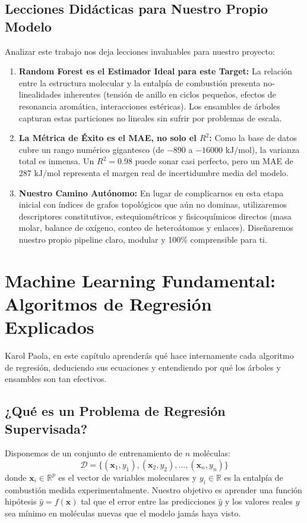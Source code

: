 \documentclass[11pt,letterpaper]{report}
\begin{document}
\section{Lecciones Didácticas para Nuestro Propio Modelo}
Analizar este trabajo nos deja lecciones invaluables para nuestro proyecto:
\begin{enumerate}[leftmargin=*]
    \item \textbf{Random Forest es el Estimador Ideal para este Target:} La relación entre la estructura molecular y la entalpía de combustión presenta no-linealidades inherentes (tensión de anillo en ciclos pequeños, efectos de resonancia aromática, interacciones estéricas). Los ensambles de árboles capturan estas particiones no lineales sin sufrir por problemas de escala.
    \item \textbf{La Métrica de Éxito es el MAE, no solo el $R^2$:} Como la base de datos cubre un rango numérico gigantesco (de $-890$ a $-16000\text{ kJ/mol}$), la varianza total es inmensa. Un $R^2 = 0.98$ puede sonar casi perfecto, pero un MAE de $287\text{ kJ/mol}$ representa el margen real de incertidumbre media del modelo.
    \item \textbf{Nuestro Camino Autónomo:} En lugar de complicarnos en esta etapa inicial con índices de grafos topológicos que aún no dominas, utilizaremos descriptores constitutivos, estequiométricos y fisicoquímicos directos (masa molar, balance de oxígeno, conteo de heteroátomos y enlaces). Diseñaremos nuestro propio pipeline claro, modular y 100\% comprensible para ti.
\end{enumerate}

\newpage

\chapter{Machine Learning Fundamental: Algoritmos de Regresión Explicados}

Karol Paola, en este capítulo aprenderás qué hace internamente cada algoritmo de regresión, deduciendo sus ecuaciones y entendiendo por qué los árboles y ensambles son tan efectivos.

\section{¿Qué es un Problema de Regresión Supervisada?}
Disponemos de un conjunto de entrenamiento de $n$ moléculas:
\begin{equation}
    \mathcal{D} = \{(\mathbf{x}_1, y_1), (\mathbf{x}_2, y_2), \dots, (\mathbf{x}_n, y_n)\}
\end{equation}
donde $\mathbf{x}_i \in \mathbb{R}^p$ es el vector de variables moleculares y $y_i \in \mathbb{R}$ es la entalpía de combustión medida experimentalmente. Nuestro objetivo es aprender una función hipótesis $\hat{y} = f(\mathbf{x})$ tal que el error entre las predicciones $\hat{y}$ y los valores reales $y$ sea mínimo en moléculas nuevas que el modelo jamás haya visto.
\end{document}
